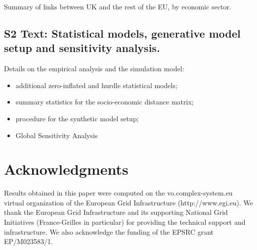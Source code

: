 \documentclass[10pt,letterpaper]{article}
\begin{document}
Summary of links between UK and the rest of the EU, by economic sector.

\subsection*{S2 Text: Statistical models, generative model setup and sensitivity analysis.\label{S2Text}}

Details on the empirical analysis and the simulation model:

\begin{itemize}
    \item additional zero-inflated and hurdle statistical models;
    \item summary statistics for the socio-economic distance matrix;
    \item procedure for the synthetic model setup;
    \item Global Sensitivity Analysis
\end{itemize}



\section*{Acknowledgments}

Results obtained in this paper were computed on the vo.complex-system.eu virtual organization of the European Grid Infrastructure (http://www.egi.eu). We thank the European Grid Infrastructure and its supporting National Grid Initiatives (France-Grilles in particular) for providing the technical support and infrastructure. We also acknowledge the funding of the EPSRC grant EP/M023583/1.




\end{document}

